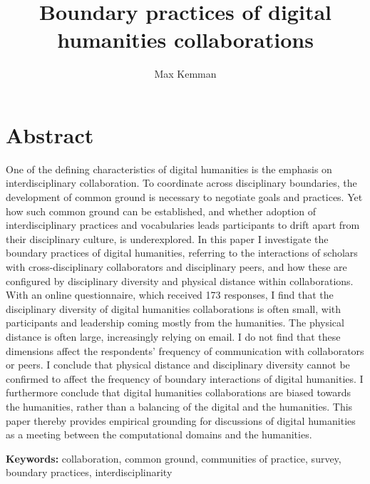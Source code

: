\documentclass{article}
\author[1,2]{Max Kemman}
\affil[1]{University of Luxembourg, Centre for Contemporary and Digital History}
\affil[2]{Dialogic}
\date{}
\title{Boundary practices of digital humanities collaborations}
\begin{document}
\maketitle

\section*{Abstract}
One of the defining characteristics of digital humanities is the emphasis on interdisciplinary collaboration. 
To coordinate across disciplinary boundaries, the development of common ground is necessary to negotiate goals and practices.
Yet how such common ground can be established, and whether adoption of interdisciplinary practices and vocabularies leads participants to drift apart from their disciplinary culture, is underexplored.
In this paper I investigate the boundary practices of digital humanities, referring to the interactions of scholars with cross-disciplinary collaborators and disciplinary peers, and how these are configured by disciplinary diversity and physical distance within collaborations.
With an online questionnaire, which received 173 responses,
I find that the disciplinary diversity of digital humanities collaborations is often small, with participants and leadership coming mostly from the humanities. The physical distance is often large, increasingly relying on email.
I do not find that these dimensions affect the respondents' frequency of communication with collaborators or peers.
I conclude that physical distance and disciplinary diversity cannot be confirmed to affect the frequency of boundary interactions of digital humanities.
I furthermore conclude that digital humanities collaborations are biased towards the humanities, rather than a balancing of the digital and the humanities.
This paper thereby provides empirical grounding for discussions of digital humanities as a meeting between the computational domains and the humanities.

\textbf{Keywords:} collaboration, common ground, communities of practice, survey, boundary practices, interdisciplinarity

 
\end{document}
